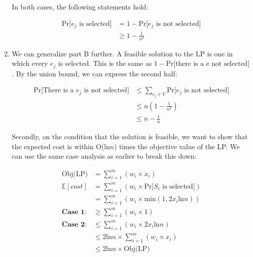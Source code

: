 \documentclass[11pt]{article}
\theoremstyle{definition}
\theoremstyle{case}
\theoremstyle{theorem}
\begin{document}
\begin{enumerate}[label=(\alph*)]
In both cases, the following statements hold:

\begin{align*}
  \text{Pr[$e_j$ is selected]} &= 1 - \text{Pr[$e_j$ is not selected]} \\
                               &\geq 1 - \frac{1}{n^2}
\end{align*}

\item We can generalize part B further. A feasible solution to the LP is one in which every $e_j$ is selected. 
This is the same as $1 - \text{Pr[there is a e not selected]}$. By the union bound, we can express the second half: 

\begin{align*}
  \text{Pr[There is a $e_j$ is not selected]} &\leq \sum_{e_j \in V} \text{Pr[$e_j$ is not selected]} \\
                                              &\leq n(1 - \frac{1}{n^2}) \\
                                              &\leq n - \frac{1}{n}
\end{align*}

Secondly, on the condition that the solution is feasible, we want to show that the expected cost is within 
O(ln$n$) times the objective value of the LP. We can use the same case analysis as earlier to break this down:

\begin{align*}
  \text{Obj(LP)} &= \sum_{i = 1}^m ( w_i \times x_i ) \\
  \mathbb{E}[cost] &= \sum_{i = 1}^m ( w_i \times \text{Pr[$S_i$ is selected]} ) \\
                   &= \sum_{i = 1}^m ( w_i \times \text{min}(1, 2x_i\text{ln}n)) \\
  \textbf{Case 1:} &\geq \sum_{i = 1}^m ( w_i \times 1 ) \\
  \textbf{Case 2:} &\leq \sum_{i = 1}^m ( w_i \times 2x_i\text{ln}n ) \\
                   &\leq 2\text{ln}n \times \sum_{i = 1}^m ( w_i \times x_i ) \\
                   &\leq 2\text{ln}n \times \text{Obj(LP)}
\end{align*}

\end{enumerate}
\end{document}
